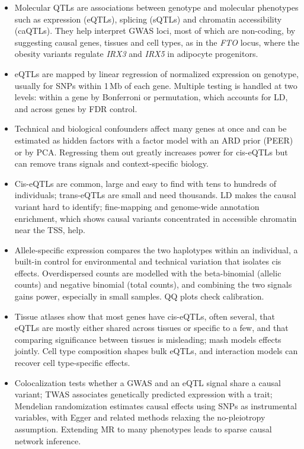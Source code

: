 \begin{itemize}
  \item Molecular QTLs are associations between genotype and molecular phenotypes such as expression (eQTLs), splicing (sQTLs) and chromatin accessibility (caQTLs). They help interpret GWAS loci, most of which are non-coding, by suggesting causal genes, tissues and cell types, as in the \textit{FTO} locus, where the obesity variants regulate \textit{IRX3} and \textit{IRX5} in adipocyte progenitors.
  \item eQTLs are mapped by linear regression of normalized expression on genotype, usually for SNPs within 1\,Mb of each gene. Multiple testing is handled at two levels: within a gene by Bonferroni or permutation, which accounts for LD, and across genes by FDR control.
  \item Technical and biological confounders affect many genes at once and can be estimated as hidden factors with a factor model with an ARD prior (PEER) or by PCA. Regressing them out greatly increases power for cis-eQTLs but can remove trans signals and context-specific biology.
  \item Cis-eQTLs are common, large and easy to find with tens to hundreds of individuals; trans-eQTLs are small and need thousands. LD makes the causal variant hard to identify; fine-mapping and genome-wide annotation enrichment, which shows causal variants concentrated in accessible chromatin near the TSS, help.
  \item Allele-specific expression compares the two haplotypes within an individual, a built-in control for environmental and technical variation that isolates cis effects. Overdispersed counts are modelled with the beta-binomial (allelic counts) and negative binomial (total counts), and combining the two signals gains power, especially in small samples. QQ plots check calibration.
  \item Tissue atlases show that most genes have cis-eQTLs, often several, that eQTLs are mostly either shared across tissues or specific to a few, and that comparing significance between tissues is misleading; mash models effects jointly. Cell type composition shapes bulk eQTLs, and interaction models can recover cell type-specific effects.
  \item Colocalization tests whether a GWAS and an eQTL signal share a causal variant; TWAS associates genetically predicted expression with a trait; Mendelian randomization estimates causal effects using SNPs as instrumental variables, with Egger and related methods relaxing the no-pleiotropy assumption. Extending MR to many phenotypes leads to sparse causal network inference.
\end{itemize}

